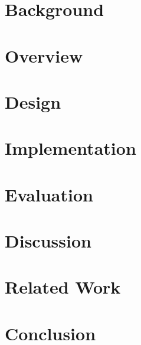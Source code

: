 \documentclass[conference]{IEEEtran}
\begin{document}
\section{Background}
\label{sec:background}


\section{Overview}
\label{sec:overview}


\section{Design}
\label{sec:design}


\section{Implementation}
\label{sec:implementation}


\section{Evaluation}
\label{sec:evaluation}


\section{Discussion}
\label{sec:discussion}


\section{Related Work}
\label{sec:related_work}


\section{Conclusion}
\label{sec:conclusion}




\end{document}
